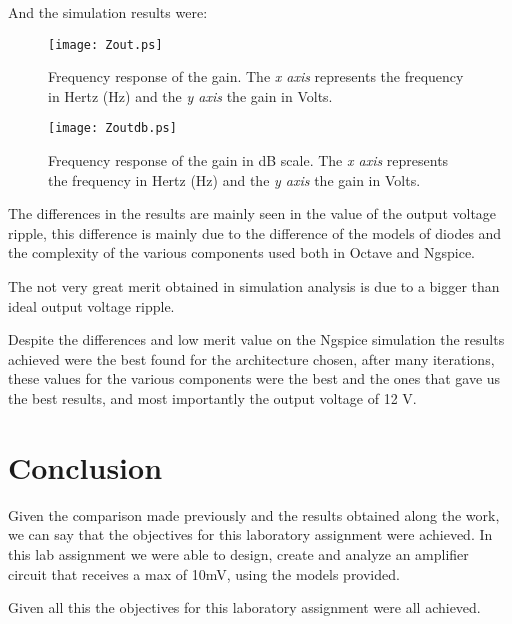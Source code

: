 And the simulation results were:

\begin{figure}[H] \centering
	\texttt{[image: Zout.ps]}
	\caption{Frequency response of the gain. The \textit{x axis} represents the frequency in Hertz (Hz) and the \textit{y axis} the gain in Volts.}
	\label{fig:sim_gain}
\end{figure}

\begin{figure}[H] \centering
	\texttt{[image: Zoutdb.ps]}
	\caption {Frequency response of the gain in dB scale. The \textit{x axis} represents the frequency in Hertz (Hz) and the \textit{y axis} the gain in Volts.}
	\label{fig:sim_gaindB}
\end{figure}

The differences in the results are mainly seen in the value of the output voltage ripple, this difference is mainly due to the difference of the models of diodes and the complexity of the various components used both in Octave and Ngspice.\par

The not very great merit obtained in simulation analysis is due to a bigger than ideal output voltage ripple.

Despite the differences and low merit value on the Ngspice simulation the results achieved were the best found for the architecture chosen, after many iterations, these values for the various components were the best and the ones that gave us the best results, and most importantly the output voltage of 12 V.


\newpage
\section{Conclusion}
\label{sec:conclusion}

Given the comparison made previously and the results obtained along the work, we can say that the objectives for this laboratory assignment were achieved. In this lab assignment we were able to design, create and analyze an amplifier circuit that receives a max of 10mV, using the models provided.\par
Given all this the objectives for this laboratory assignment were all achieved.
